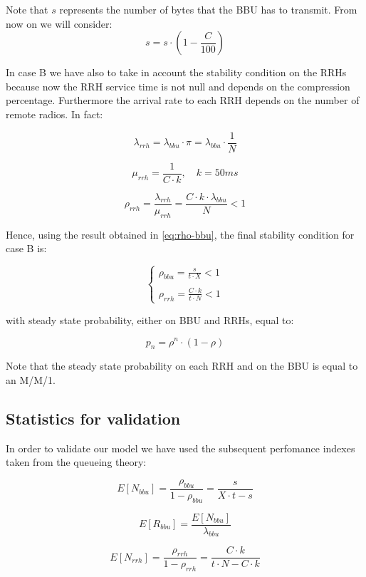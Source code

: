 \documentclass[11pt,a4paper,oneside, openright]{article}
\begin{document}
Note that $s$ represents the number of bytes that the BBU has to transmit. From now on we will consider:
$$s = s\cdot(1-\frac{C}{100})$$

In case B we have also to take in account the stability condition on the RRHs because now the RRH service time is not null and depends on the compression percentage. Furthermore the arrival rate to each RRH depends on the number of remote radios. In fact:

$$ \lambda_{rrh} = \lambda_{bbu} \cdot \pi = \lambda_{bbu} \cdot \frac{1}{N} $$

$$ \mu_{rrh} = \frac{1}{C \cdot k}, \quad k = 50ms $$

\begin{equation}
\rho_{rrh} = \frac{\lambda_{rrh}}{\mu_{rrh}} = \frac{C \cdot k \cdot \lambda_{bbu}}{N} < 1
\end{equation}

Hence, using the result obtained in \eqref{eq:rho-bbu}, the final stability condition for case B is:

$$ \begin{cases} \rho_{bbu} = \frac{s}{t \cdot X} < 1 \\ \\ \rho_{rrh} = \frac{C \cdot k}{t \cdot N} < 1 \end{cases} $$

with steady state probability, either on BBU and RRHs, equal to:

$$ p_{n} = \rho^n \cdot (1 - \rho) $$

Note that the steady state probability on each RRH and on the BBU is equal to an M/M/1.


\subsection{Statistics for validation}
In order to validate our model we have used the subsequent perfomance indexes taken from the queueing theory:

$$ E[N_{bbu}] = \frac{\rho_{bbu}}{1 - \rho_{bbu}} = \frac{s}{X \cdot t - s}$$

$$ E[R_{bbu}] = \frac{E[N_{bbu}]}{\lambda_{bbu}} $$

$$ E[N_{rrh}] = \frac{\rho_{rrh}}{1 - \rho_{rrh}} = \frac{C \cdot k}{t \cdot N - C \cdot k}$$
\end{document}
